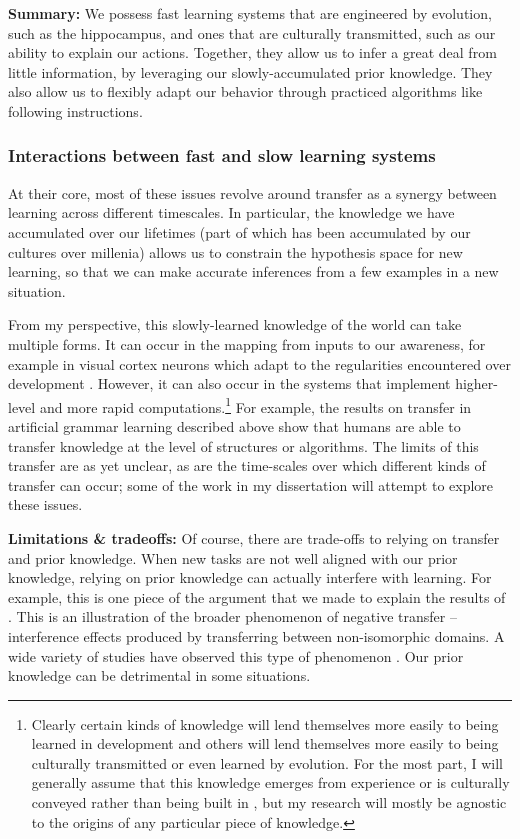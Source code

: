 \documentclass[11pt]{article}
\begin{document}
\textbf{Summary:} We possess fast learning systems that are engineered by evolution, such as the hippocampus, and ones that are culturally transmitted, such as our ability to explain our actions. Together, they allow us to infer a great deal from little information, by leveraging our slowly-accumulated prior knowledge. They also allow us to flexibly adapt our behavior through practiced algorithms like following instructions. \par 

\subsubsection{Interactions between fast and slow learning systems} \label{fast_slow_interactions}
At their core, most of these issues revolve around transfer as a synergy between learning across different timescales. In particular, the knowledge we have accumulated over our lifetimes (part of which has been accumulated by our cultures over millenia) allows us to constrain the hypothesis space for new learning, so that we can make accurate inferences from a few examples in a new situation. \par 
From my perspective, this slowly-learned knowledge of the world can take multiple forms. It can occur in the mapping from inputs to our awareness, for example in visual cortex neurons which adapt to the regularities encountered over development \citep{Barlow1975}. However, it can also occur in the systems that implement higher-level and more rapid computations.\footnote{Clearly certain kinds of knowledge will lend themselves more easily to being learned in development and others will lend themselves more easily to being culturally transmitted or even learned by evolution. For the most part, I will generally assume that this knowledge emerges from experience or is culturally conveyed rather than being built in \citep{Hansen2017}, but my research will mostly be agnostic to the origins of any particular piece of knowledge.} For example, the results on transfer in artificial grammar learning described above \citep[e.g.]{Tunney2001} show that humans are able to transfer knowledge at the level of structures or algorithms. The limits of this transfer are as yet unclear, as are the time-scales over which different kinds of transfer can occur; some of the work in my dissertation will attempt to explore these issues.\par  
\textbf{Limitations \& tradeoffs:} Of course, there are trade-offs to relying on transfer and prior knowledge. When new tasks are not well aligned with our prior knowledge, relying on prior knowledge can actually interfere with learning. For example, this is one piece of the argument that we made \citep{Lampinen2017b} to explain the results of \citet{Kaminski2008}. This is an illustration of the broader phenomenon of negative transfer -- interference effects produced by transferring between non-isomorphic domains. A wide variety of studies have observed this type of phenomenon \citep[e.g.]{Luchins1942, Landrum2005}. Our prior knowledge can be detrimental in some situations. \par
\end{document}
